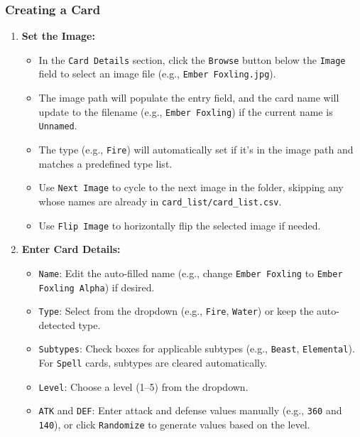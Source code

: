 \subsubsection{Creating a Card}

\begin{enumerate}
    \item \textbf{Set the Image:}
          \begin{itemize}
              \item In the \texttt{Card Details} section, click the \texttt{Browse} button below the \texttt{Image} field to select an image file (e.g., \texttt{Ember Foxling.jpg}).
              \item The image path will populate the entry field, and the card name will update to the filename (e.g., \texttt{Ember Foxling}) if the current name is \texttt{Unnamed}.
              \item The type (e.g., \texttt{Fire}) will automatically set if it’s in the image path and matches a predefined type list.
              \item Use \texttt{Next Image} to cycle to the next image in the folder, skipping any whose names are already in \texttt{card\_list/card\_list.csv}.
              \item Use \texttt{Flip Image} to horizontally flip the selected image if needed.
          \end{itemize}

    \item \textbf{Enter Card Details:}
          \begin{itemize}
              \item \texttt{Name}: Edit the auto-filled name (e.g., change \texttt{Ember Foxling} to \texttt{Ember Foxling Alpha}) if desired.
              \item \texttt{Type}: Select from the dropdown (e.g., \texttt{Fire}, \texttt{Water}) or keep the auto-detected type.
              \item \texttt{Subtypes}: Check boxes for applicable subtypes (e.g., \texttt{Beast}, \texttt{Elemental}). For \texttt{Spell} cards, subtypes are cleared automatically.
              \item \texttt{Level}: Choose a level (1--5) from the dropdown.
              \item \texttt{ATK} and \texttt{DEF}: Enter attack and defense values manually (e.g., \texttt{360} and \texttt{140}), or click \texttt{Randomize} to generate values based on the level.
          \end{itemize}


\end{enumerate}
